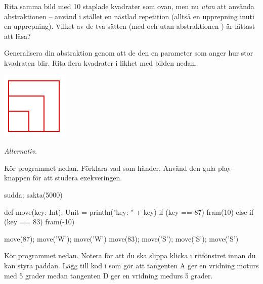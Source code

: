 \Subtask Rita samma bild med 10 staplade kvadrater som ovan, men nu \emph{utan} att använda abstraktionen  -- använd i stället en nästlad repetition (alltså en upprepning inuti en upprepning). Vilket av de två sätten (med och utan abstraktionen ) är lättast att läsa? %

\Subtask Generalisera din abstraktion  genom att de den en parameter  som anger hur stor kvadraten blir. Rita flera kvadrater i likhet med bilden nedan.

\includegraphics{../img/kojo/square-param}






\Task \emph{Alternativ.} \label{kojo:alt}

\Subtask Kör programmet nedan. Förklara vad som händer. Använd den gula play-knappen för att studera exekveringen.

\begin{Code}
sudda; sakta(5000)

def move(key: Int): Unit = {
  println("key: " + key)
  if (key == 87) fram(10)
  else if (key == 83) fram(-10)
}

move(87); move('W'); move('W')
move(83); move('S'); move('S'); move('S')
\end{Code}

\Subtask \label{subtask:keypress}  Kör programmet nedan. Notera  för att du ska slippa klicka i ritfönstret innan du kan styra paddan. Lägg till kod i  som gör att tangenten A ger en vridning moturs med 5 grader medan tangenten D ger en vridning medurs 5 grader.

